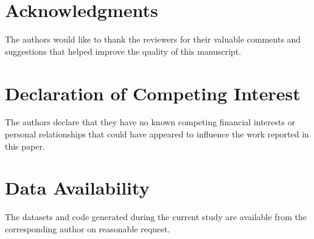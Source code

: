 \documentclass[review,3p]{elsarticle}
\begin{document}
\linenumbers

















\section*{Acknowledgments}
The authors would like to thank the reviewers for their valuable comments and suggestions that helped improve the quality of this manuscript.

\section*{Declaration of Competing Interest}
The authors declare that they have no known competing financial interests or personal relationships that could have appeared to influence the work reported in this paper.

\section*{Data Availability}
The datasets and code generated during the current study are available from the corresponding author on reasonable request.



\end{document}
